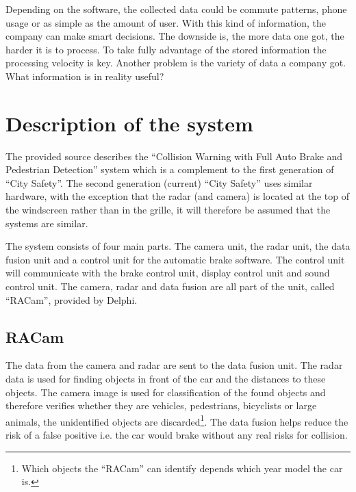 \documentclass[conference]{IEEEtran}
\begin{document}
Depending on the software, the collected data could be commute patterns, phone usage or as simple as the amount of user. With this kind of information, the company can make smart decisions. The downside is, the more data one got, the harder it is to process. To take fully advantage of the stored information the processing velocity is key. Another problem is the variety of data a company got. What information is in reality useful? \cite{SpeedDataEco} %


\section{Description of the system}
The provided source describes the ``Collision Warning with Full Auto Brake and Pedestrian Detection'' system which is a complement to the first generation of ``City Safety''. The second generation (current) ``City Safety'' uses similar hardware, with the exception that the radar (and camera) is located at the top of the windscreen rather than in the grille, it will therefore be assumed that the systems are similar. \cite{SysDescription,RACam,DelphiVolvo}

The system consists of four main parts. The camera unit, the radar unit, the data fusion unit and a control unit for the automatic brake software. The control unit will communicate with the brake control unit, display control unit and sound control unit. The camera, radar and data fusion are all part of the unit, called ``RACam'', provided by Delphi. \cite{SysDescription,DelphiVolvo}

\subsection{RACam}
The data from the camera and radar are sent to the data fusion unit. The radar data is used for finding objects in front of the car and the distances to these objects. The camera image is used for classification of the found objects and therefore verifies whether they are vehicles, pedestrians, bicyclists or large animals, the unidentified objects are discarded\footnote{Which objects the ``RACam'' can identify depends which year model the car is.}. The data fusion helps reduce the risk of a false positive i.e. the car would brake without any real risks for collision.\cite{SysDescription}
\end{document}
